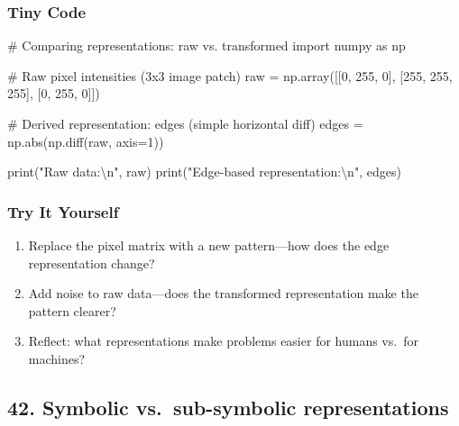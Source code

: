 \documentclass[
  letterpaper,
  DIV=11,
  numbers=noendperiod]{scrreprt}
\newenvironment{Shaded}{\begin{snugshade}}{\end{snugshade}}
\newcommand{\BuiltInTok}[1]{\textcolor[rgb]{0.00,0.23,0.31}{#1}}
\newcommand{\CharTok}[1]{\textcolor[rgb]{0.13,0.47,0.30}{#1}}
\newcommand{\CommentTok}[1]{\textcolor[rgb]{0.37,0.37,0.37}{#1}}
\newcommand{\DecValTok}[1]{\textcolor[rgb]{0.68,0.00,0.00}{#1}}
\newcommand{\ImportTok}[1]{\textcolor[rgb]{0.00,0.46,0.62}{#1}}
\newcommand{\NormalTok}[1]{\textcolor[rgb]{0.00,0.23,0.31}{#1}}
\newcommand{\OperatorTok}[1]{\textcolor[rgb]{0.37,0.37,0.37}{#1}}
\newcommand{\StringTok}[1]{\textcolor[rgb]{0.13,0.47,0.30}{#1}}
\providecommand{\tightlist}{%
  \setlength{\itemsep}{0pt}\setlength{\parskip}{0pt}}
\begin{document}
\subsubsection{Tiny Code}\label{tiny-code-40}

\begin{Shaded}
\begin{Highlighting}[]
\CommentTok{\# Comparing representations: raw vs. transformed}
\ImportTok{import}\NormalTok{ numpy }\ImportTok{as}\NormalTok{ np}

\CommentTok{\# Raw pixel intensities (3x3 image patch)}
\NormalTok{raw }\OperatorTok{=}\NormalTok{ np.array([[}\DecValTok{0}\NormalTok{, }\DecValTok{255}\NormalTok{, }\DecValTok{0}\NormalTok{],}
\NormalTok{                [}\DecValTok{255}\NormalTok{, }\DecValTok{255}\NormalTok{, }\DecValTok{255}\NormalTok{],}
\NormalTok{                [}\DecValTok{0}\NormalTok{, }\DecValTok{255}\NormalTok{, }\DecValTok{0}\NormalTok{]])}

\CommentTok{\# Derived representation: edges (simple horizontal diff)}
\NormalTok{edges }\OperatorTok{=}\NormalTok{ np.}\BuiltInTok{abs}\NormalTok{(np.diff(raw, axis}\OperatorTok{=}\DecValTok{1}\NormalTok{))}

\BuiltInTok{print}\NormalTok{(}\StringTok{"Raw data:}\CharTok{\textbackslash{}n}\StringTok{"}\NormalTok{, raw)}
\BuiltInTok{print}\NormalTok{(}\StringTok{"Edge{-}based representation:}\CharTok{\textbackslash{}n}\StringTok{"}\NormalTok{, edges)}
\end{Highlighting}
\end{Shaded}

\subsubsection{Try It Yourself}\label{try-it-yourself-40}

\begin{enumerate}
\def\labelenumi{\arabic{enumi}.}
\tightlist
\item
  Replace the pixel matrix with a new pattern---how does the edge
  representation change?
\item
  Add noise to raw data---does the transformed representation make the
  pattern clearer?
\item
  Reflect: what representations make problems easier for humans vs.~for
  machines?
\end{enumerate}

\subsection{42. Symbolic vs.~sub-symbolic
representations}\label{symbolic-vs.-sub-symbolic-representations}
\end{document}
